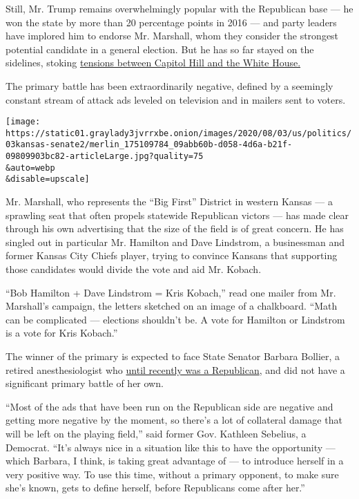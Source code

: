 Still, Mr. Trump remains overwhelmingly popular with the Republican base
--- he won the state by more than 20 percentage points in 2016 --- and
party leaders have implored him to endorse Mr. Marshall, whom they
consider the strongest potential candidate in a general election. But he
has so far stayed on the sidelines, stoking
\href{https://www.nytimes3xbfgragh.onion/2020/07/30/us/politics/kansas-senate-kobach-trump.html}{tensions
between Capitol Hill and the White House.}

The primary battle has been extraordinarily negative, defined by a
seemingly constant stream of attack ads leveled on television and in
mailers sent to voters.

\texttt{[image: https://static01.graylady3jvrrxbe.onion/images/2020/08/03/us/politics/03kansas-senate2/merlin\_175109784\_09abb60b-d058-4d6a-b21f-09809903bc82-articleLarge.jpg?quality=75\\\&auto=webp\\\&disable=upscale]}

Mr. Marshall, who represents the ``Big First'' District in western
Kansas --- a sprawling seat that often propels statewide Republican
victors --- has made clear through his own advertising that the size of
the field is of great concern. He has singled out in particular Mr.
Hamilton and Dave Lindstrom, a businessman and former Kansas City Chiefs
player, trying to convince Kansans that supporting those candidates
would divide the vote and aid Mr. Kobach.

``Bob Hamilton + Dave Lindstrom = Kris Kobach,'' read one mailer from
Mr. Marshall's campaign, the letters sketched on an image of a
chalkboard. ``Math can be complicated --- elections shouldn't be. A vote
for Hamilton or Lindstrom is a vote for Kris Kobach.''

The winner of the primary is expected to face State Senator Barbara
Bollier, a retired anesthesiologist who
\href{https://www.kansas.com/news/politics-government/article222990385.html}{until
recently was a Republican}, and did not have a significant primary
battle of her own.

``Most of the ads that have been run on the Republican side are negative
and getting more negative by the moment, so there's a lot of collateral
damage that will be left on the playing field,'' said former Gov.
Kathleen Sebelius, a Democrat. ``It's always nice in a situation like
this to have the opportunity --- which Barbara, I think, is taking great
advantage of --- to introduce herself in a very positive way. To use
this time, without a primary opponent, to make sure she's known, gets to
define herself, before Republicans come after her.''

